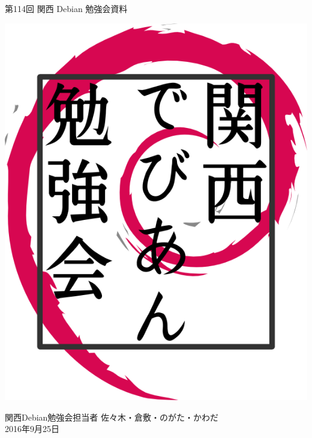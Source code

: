 \documentclass[mingoth,a4paper]{jsarticle}
\newcommand{\debmtgyear}{2016}
\newcommand{\debmtgdate}{25}
\newcommand{\debmtgmonth}{9}
\newcommand{\debmtgnumber}{114}
\begin{document}
\begin{titlepage}


  第\debmtgnumber{}回 関西 Debian 勉強会資料

  \vspace{2cm}

  \begin{center}
    \includegraphics{image200802/kansaidebianlogo.png}
  \end{center}

  \begin{flushright}
    \hfill{}関西Debian勉強会担当者 佐々木・倉敷・のがた・かわだ \\
    \hfill{}\debmtgyear{}年\debmtgmonth{}月\debmtgdate{}日
  \end{flushright}

  \thispagestyle{empty}
\end{titlepage}

\end{document}

